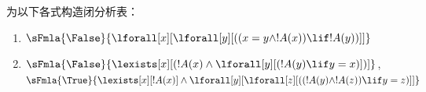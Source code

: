 \documentclass[../../../include/open-logic-section]{subfiles}
\begin{document}
\begin{prob}
为以下各式构造闭分析表：
\begin{enumerate}
\item $\sFmla{\False}{\lforall[x][\lforall[y][((x = y \land !A(x))
      \lif !A(y))]]}$
\item $\sFmla{\False}{\lexists[x][(!A(x) \land
    \lforall[y][(!A(y) \lif y = x)])]}$,\\
  $\sFmla{\True}{\lexists[x][!A(x)] \land
    \lforall[y][\lforall[z][((!A(y) \land !A(z)) \lif y = z)]]}$
\end{enumerate}
\end{prob}
\end{document}
